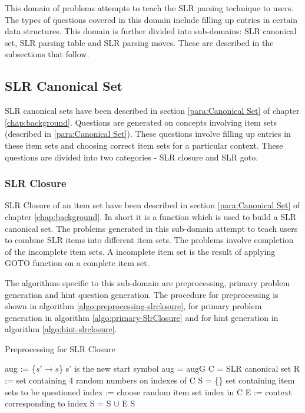 This domain of problems attempts to teach the SLR parsing technique to users. The types of questions covered in this domain include filling up entries in certain data structures. This domain is further divided into sub-domains: SLR canonical set, SLR parsing table and SLR parsing moves. These are described in the subsections that follow. 

\subsection{SLR Canonical Set}
\label{subsec:slrcanonical}

SLR canonical sets have been described in section \ref{para:Canonical Set} of chapter \ref{chap:background}. Questions are generated on concepts involving item sets (described in \ref{para:Canonical Set}). These questions involve filling up entries in these  item sets and choosing correct item sets for a particular context. These questions are divided into two categories - SLR closure and SLR goto.

\subsubsection{SLR Closure}
\label{ssec:slrclosure}
SLR Closure of an item set have been described in section \ref{para:Canonical Set} of chapter \ref{chap:background}. In short it is a function which is used to build a SLR canonical set. The problems generated in this sub-domain attempt to teach users to combine SLR items into different item sets. The problems involve completion of the incomplete item sets. A incomplete item set is the result of applying GOTO function on a complete item set.

The algorithms specific to this sub-domain are preprocessing, primary problem generation and hint question generation. The procedure for preprocessing is shown in algorithm \ref{algo:preprocessing-slrclosure}, for primary problem generation in algorithm \ref{algo:primary-SlrClosure} and for hint generation in algorithm \ref{algo:hint-slrclosure}.

\begin{algorithm}
\caption{Preprocessing for SLR Closure}
\label{algo:preprocessing-slrclosure}
\begin{algorithmic}[1]
\State aug := \{$s'\rightarrow s$\} \Comment s' is the new start symbol
\State aug = aug\cup G
\State C =   \Comment SLR canonical set
\State R := set containing 4 random numbers on indexes of C
\State S = \{\} \Comment set containing item sets to be questioned
\State index := choose random item set index in C
\State E := context corresponding to index
\State S = S $\cup$ E
\EndFor
\State \Return S
\EndFunction
\end{algorithmic}
\end{algorithm}

